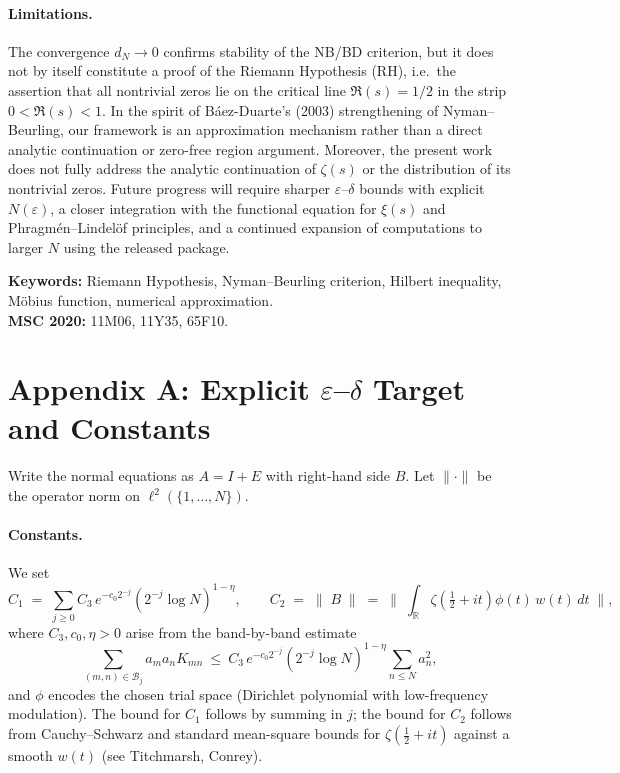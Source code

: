\documentclass[11pt]{article}
\theoremstyle{remark}
\begin{document}
\paragraph{Limitations.}
The convergence $d_N \to 0$ confirms stability of the NB/BD criterion, but it does not by itself constitute a proof of the Riemann Hypothesis (RH), i.e.\ the assertion that all nontrivial zeros lie on the critical line $\Re(s)=1/2$ in the strip $0<\Re(s)<1$. 
In the spirit of B\'aez-Duarte's (2003) strengthening of Nyman--Beurling, our framework is an approximation mechanism rather than a direct analytic continuation or zero-free region argument. 
Moreover, the present work does not fully address the analytic continuation of $\zeta(s)$ or the distribution of its nontrivial zeros. 
Future progress will require sharper $\varepsilon$--$\delta$ bounds with explicit $N(\varepsilon)$, a closer integration with the functional equation for $\xi(s)$ and Phragm\'en--Lindel\"of principles, and a continued expansion of computations to larger $N$ using the released package.

\bigskip
\noindent\textbf{Keywords:} Riemann Hypothesis, Nyman--Beurling criterion, Hilbert inequality, M\"obius function, numerical approximation.\\
\noindent\textbf{MSC 2020:} 11M06, 11Y35, 65F10.

\appendix
\section*{Appendix A: Explicit $\varepsilon$--$\delta$ Target and Constants}
Write the normal equations as $A=I+E$ with right-hand side $B$.
Let $\|\cdot\|$ be the operator norm on $\ell^2(\{1,\dots,N\})$.

\paragraph{Constants.}
We set
\[
C_1 \;=\; \sum_{j\ge 0} C_3\,e^{-c_0 2^{-j}}(2^{-j}\log N)^{1-\eta},
\qquad
C_2 \;=\; \big\|\;B\;\big\| \;=\; 
\Big\|\;\int_{\mathbb{R}} \zeta\!\left(\tfrac12+it\right)\phi(t)\,w(t)\,dt\;\Big\|,
\]
where $C_3,c_0,\eta>0$ arise from the band-by-band estimate
\[
\sum_{(m,n)\in\mathcal{B}_j} a_ma_nK_{mn} \ \le\ C_3\,e^{-c_0 2^{-j}}(2^{-j}\log N)^{1-\eta}\sum_{n\le N}a_n^2,
\]
and $\phi$ encodes the chosen trial space (Dirichlet polynomial with low-frequency modulation).
The bound for $C_1$ follows by summing in $j$; the bound for $C_2$ follows from Cauchy--Schwarz and standard mean-square bounds for $\zeta(\tfrac12+it)$ against a smooth $w(t)$ (see Titchmarsh, Conrey).
\end{document}
